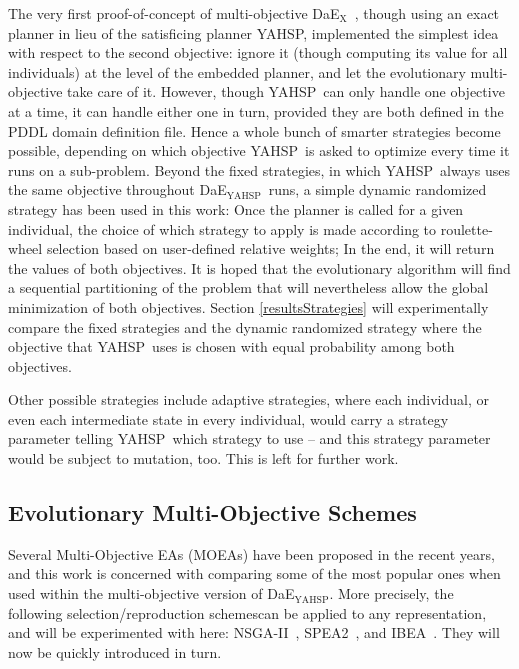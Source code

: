 \documentclass{llncs}
\def\DAEX{{\sc DaE$_{\text{X}}$}}
\newcommand{\DAEYAHSP}{{\sc DaE$_{\text{YAHSP}}$}}
\def\YAHSP{{\sc YAHSP}}
\begin{document}
The very first proof-of-concept of multi-objective \DAEX\ \cite{Schoenauer2006}, though using an exact planner in lieu of the satisficing planner \YAHSP, implemented the simplest idea with respect to the second objective: ignore it (though computing its value for all individuals) at the level of the embedded planner, and let the evolutionary multi-objective take care of it. However, though \YAHSP\ can only handle one objective at a time, it can handle either one in turn, provided they are both defined in the PDDL domain definition file. Hence a whole bunch of smarter strategies become possible, depending on which objective \YAHSP\ is asked to optimize every time it runs on a sub-problem. Beyond the fixed strategies, in which \YAHSP\ always uses the same objective throughout  \DAEYAHSP\ runs, a simple dynamic randomized strategy has been used in this work: 
Once the planner is called for a given individual, the choice of which strategy to apply is made according to roulette-wheel selection based on user-defined relative weights; In the end, it will return the values of both objectives. 
It is hoped that the evolutionary algorithm will find a sequential partitioning of the problem that will nevertheless allow the global minimization of both objectives. Section \ref{resultsStrategies} will experimentally compare the fixed strategies and the dynamic randomized strategy where the objective that \YAHSP\ uses is chosen with equal probability among both objectives.

Other possible strategies include adaptive strategies, where each individual, or even each intermediate state in every individual, would carry a strategy parameter telling \YAHSP\ which strategy to use -- and this strategy parameter would be subject to mutation, too. This is left for further work. 

% 
\subsection{Evolutionary Multi-Objective Schemes}
\label{sec:evolutionaryMOA}

Several Multi-Objective EAs (MOEAs) have been proposed in the recent years, and this work is concerned with comparing some of the most popular ones when used within the multi-objective version of \DAEYAHSP.
More precisely, the following selection/reproduction schemescan be applied to any representation, and will be experimented with here: NSGA-II~\cite{Deb2002}, SPEA2~\cite{Zitzler2002}, and IBEA~\cite{Zitzler2004}. They will now be quickly introduced in turn.
\end{document}
